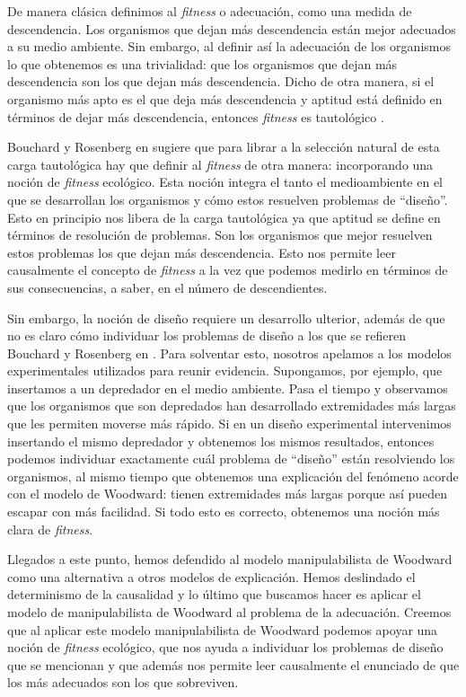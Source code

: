 De manera clásica definimos al \emph{fitness} o adecuación, como una medida de descendencia. Los organismos que dejan más descendencia están mejor adecuados a su medio ambiente. Sin embargo, al definir así la adecuación de los organismos lo que obtenemos es una trivialidad: que los organismos que dejan más descendencia son los que dejan más descendencia. Dicho de otra manera, si el organismo más apto es el que deja más descendencia y aptitud está definido en términos de dejar más descendencia, entonces \emph{fitness} es tautológico \cite{Paul1992, sep-fitness}.

Bouchard y Rosenberg en \cite{Bouchard2004} sugiere que para librar a la selección natural de esta carga tautológica hay que definir al \emph{fitness} de otra manera: incorporando una noción de \emph{fitness} ecológico. Esta noción integra el tanto el medioambiente en el que se desarrollan los organismos y cómo estos resuelven problemas de ``diseño''. Esto en principio nos libera de la carga tautológica ya que aptitud se define en términos de resolución de problemas. Son los organismos que mejor resuelven estos problemas los que dejan más descendencia. Esto nos permite leer causalmente el concepto de \emph{fitness} a la vez que podemos medirlo en términos de sus consecuencias, a saber, en el número de descendientes.

Sin embargo, la noción de diseño requiere un desarrollo ulterior, además de que no es claro cómo individuar los problemas de diseño a los que se refieren Bouchard y Rosenberg en \citeyear{Bouchard2004}. Para solventar esto, nosotros apelamos a los modelos experimentales utilizados para reunir evidencia. Supongamos, por ejemplo, que insertamos a un depredador en el medio ambiente. Pasa el tiempo y observamos que los organismos que son depredados han desarrollado extremidades más largas que les permiten moverse más rápido. Si en un diseño experimental intervenimos insertando el mismo depredador y obtenemos los mismos resultados, entonces podemos individuar exactamente cuál problema de ``diseño'' están resolviendo los organismos, al mismo tiempo que obtenemos una explicación del fenómeno acorde con el modelo de Woodward: tienen extremidades más largas porque así pueden escapar con más facilidad. Si todo esto es correcto, obtenemos una noción más clara de \emph{fitness}.

Llegados a este punto, hemos defendido al modelo manipulabilista de Woodward como una alternativa a otros modelos de explicación. Hemos deslindado el determinismo de la causalidad y lo último que buscamos hacer es aplicar el modelo de manipulabilista de Woodward al problema de la adecuación. Creemos que al aplicar este modelo manipulabilista de Woodward podemos apoyar una noción de \emph{fitness} ecológico, que nos ayuda a individuar los problemas de diseño que se mencionan y que además nos permite leer causalmente el enunciado de que los más adecuados son los que sobreviven.



